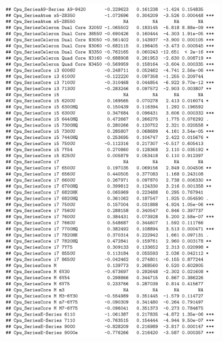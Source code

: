 \documentclass[12pt]{article}
\begin{document}
\begin{figure}[h!]
    \centering
    \includegraphics{Model_1_Sum(2_3).png}
    \label{fig:SUM12}
\end{figure}
\end{document}
